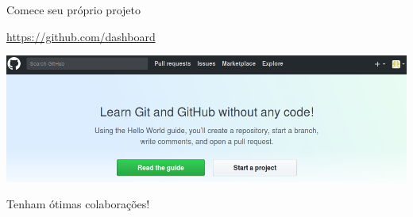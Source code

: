 \documentclass{beamer}
\begin{document}
\begin{frame}{Comece seu próprio projeto}
  \begin{center}
    \url{https://github.com/dashboard}
    
    \includegraphics[scale=0.3]{./figs/Start_a_project_GitHub.png}
  \end{center}
\end{frame}

\begin{frame}
  \vspace{1cm}
  \begin{center}
    {\Huge Tenham ótimas colaborações!}
  \end{center}
\end{frame}
\end{document}
